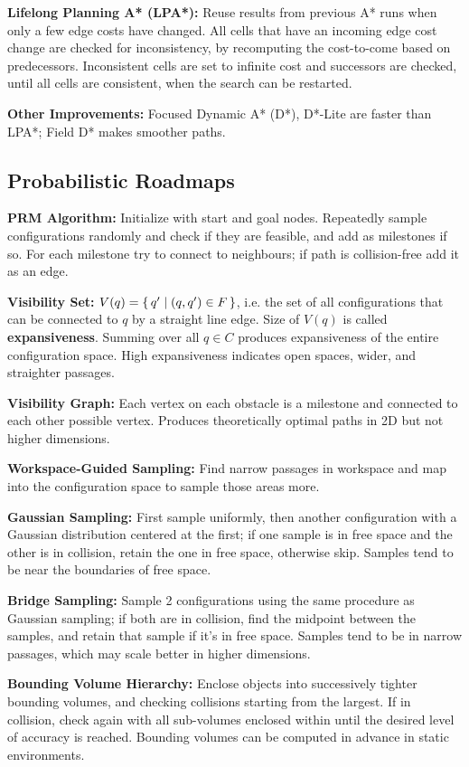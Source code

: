 \documentclass[twocolumn, 8pt]{extarticle}
\begin{document}
\textbf{Lifelong Planning A* (LPA*):} Reuse results from previous A* runs when only a few edge costs have changed. All
cells that have an incoming edge cost change are checked for inconsistency, by recomputing the cost-to-come based on
predecessors. Inconsistent cells are set to infinite cost and successors are checked, until all cells are consistent,
when the search can be restarted.

\textbf{Other Improvements:} Focused Dynamic A* (D*), D*-Lite are faster than LPA*; Field D* makes smoother paths.

\subsection{Probabilistic Roadmaps}

\textbf{PRM Algorithm:} Initialize with start and goal nodes. Repeatedly sample configurations randomly and check if
they are feasible, and add as milestones if so. For each milestone try to connect to neighbours; if path is
collision-free add it as an edge.

\textbf{Visibility Set:} \(V(q) = \set{q' | (q, q') \in F}\), i.e. the set of all configurations that can be connected
to \(q\) by a straight line edge. Size of \(V(q)\) is called \textbf{expansiveness}. Summing over all \(q \in C\)
produces expansiveness of the entire configuration space. High expansiveness indicates open spaces, wider, and
straighter passages.

\textbf{Visibility Graph:} Each vertex on each obstacle is a milestone and connected to each other possible vertex.
Produces theoretically optimal paths in 2D but not higher dimensions.

\textbf{Workspace-Guided Sampling:} Find narrow passages in workspace and map into the configuration space to sample
those areas more.

\textbf{Gaussian Sampling:} First sample uniformly, then another configuration with a Gaussian distribution centered at
the first; if one sample is in free space and the other is in collision, retain the one in free space, otherwise skip.
Samples tend to be near the boundaries of free space.

\textbf{Bridge Sampling:} Sample 2 configurations using the same procedure as Gaussian sampling; if both are in
collision, find the midpoint between the samples, and retain that sample if it's in free space. Samples tend to be in
narrow passages, which may scale better in higher dimensions.

\textbf{Bounding Volume Hierarchy:} Enclose objects into successively tighter bounding volumes, and checking collisions
starting from the largest. If in collision, check again with all sub-volumes enclosed within until the desired level
of accuracy is reached. Bounding volumes can be computed in advance in static environments.
\end{document}
